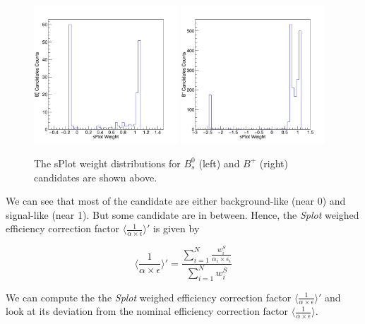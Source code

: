 \begin{figure}[h]
\begin{center}
\includegraphics[width= 0.48\textwidth]{Figures/Chapter4/Bs_sPLOTEffDistribution.png}
\includegraphics[width= 0.48\textwidth]{Figures/Chapter4/BP_sPLOTEffDistribution.png}
\caption{The sPlot weight distributions for $B_s^0$ (left) and $B^+$ (right) candidates are shown above.}
\label{fig:sPlotEffWeight}
\end{center}
\end{figure}

We can see that most of the candidate are either background-like (near 0) and signal-like (near 1). But some candidate are in between. Hence, the \textit{Splot} weighed efficiency correction factor $\langle\frac{1}{\alpha \times \epsilon} \rangle'$ is given by

\begin{equation}
\langle\frac{1}{\alpha \times \epsilon} \rangle' = \frac{\sum_{i = 1}^{N} \frac{w^S_i}{\alpha_i \times \epsilon_i}}{\sum_{i = 1}^{N}  w^S_i}
\end{equation}

We can compute the the \textit{Splot} weighed efficiency correction factor $\langle\frac{1}{\alpha \times \epsilon} \rangle'$ and look at its deviation from the nominal efficiency correction factor $\langle\frac{1}{\alpha \times \epsilon} \rangle$. 


